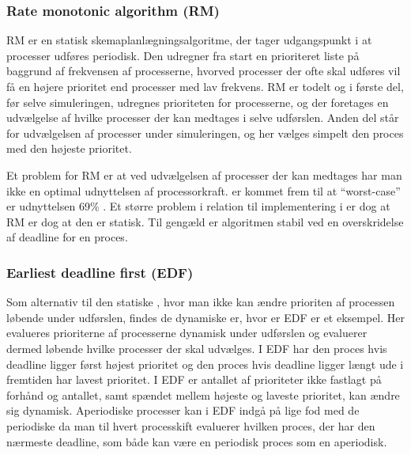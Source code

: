 
\subsubsection{Rate monotonic algorithm (RM)}
RM er en statisk skemaplanlægningsalgoritme, der tager udgangspunkt i at processer udføres periodisk. Den udregner fra start en prioriteret liste på baggrund af frekvensen af processerne, hvorved processer der ofte skal udføres vil få en højere prioritet end processer med lav frekvens. RM er todelt og i første del, før selve simuleringen, udregnes prioriteten for processerne, og der foretages en udvælgelse af hvilke processer der kan medtages i selve udførslen. Anden del står for udvælgelsen af processer  under simuleringen, og her vælges simpelt den proces med den højeste prioritet. 

Et problem for RM er at ved udvælgelsen af processer der kan medtages har man ikke en optimal udnyttelsen af processorkraft.  er kommet frem til at ``worst-case'' er udnyttelsen 69\% \cite{lehoczky1989rate}. Et større problem i relation til implementering i \pycsp er dog at RM er dog at den er statisk. Til gengæld er algoritmen stabil ved en overskridelse af deadline for en proces. 

\subsubsection{Earliest deadline first (EDF)}
\label{sec:edf}
Som alternativ til den statiske \sched, hvor man ikke kan ændre prioriten af processen løbende under udførslen, findes de dynamiske \sched er, hvor er EDF er et eksempel. Her evalueres prioriterne af processerne dynamisk under udførslen og evaluerer dermed løbende hvilke processer der skal udvælges. I EDF har den proces hvis deadline ligger først højest prioritet og den proces hvis deadline ligger længt ude i fremtiden har lavest prioritet. I EDF er antallet af prioriteter ikke fastlagt på forhånd og antallet, samt spændet mellem højeste og laveste prioritet, kan ændre sig dynamisk. Aperiodiske processer kan i EDF indgå på lige fod med de periodiske da man til hvert processkift evaluerer hvilken proces, der har den nærmeste deadline, som både kan være en periodisk proces som en aperiodisk.

